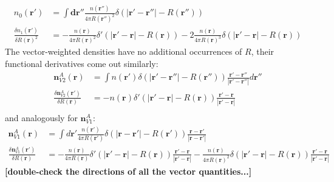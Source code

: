 \documentclass[letterpaper,twocolumn,amsmath,amssymb,jcp,10pt,aip]{revtex4-1}
\newcommand{\red}[1]{{\bf \color{red} #1}}
\newcommand{\rr}{\textbf{r}}
\newcommand{\fixme}[1]{\red{[#1]}}
\begin{document}
\begin{widetext}
\begin{align}
  n_0(\rr') &= \int \mathbf{dr''} \frac{n(\rr'')}{4\pi R(\rr'')^2}
  \delta(|\rr'-\rr''| - R(\rr'')) \\
  \frac{\delta n_1(\rr')}{\delta R(\rr)^2}
  &= -\frac{n(\rr)}{4\pi
    R(\rr)^2}\delta'(|\rr'-\rr| - R(\rr))
  -
  2\frac{n(\rr)}{4\pi
    R(\rr)^3}\delta(|\rr'-\rr| - R(\rr))
\end{align}
The vector-weighted densities have no additional occurrences of $R$,
their functional derivatives come out similarly:
\begin{align}
  \mathbf{n}_{V2}^{A}(\rr) &= \int n(\rr') \delta(|\rr' - \rr''| - R(\rr''))
    \frac{\rr'-\rr''}{|\rr'-\rr''|} d \rr''\\
  \frac{\delta \mathbf{n}_{V2}^{A}(\rr')}{\delta R(\rr)} &= - n(\rr) \delta'(|\rr' - \rr| - R(\rr))
    \frac{\rr'-\rr}{|\rr'-\rr|}\\
\end{align}
and analogously for $\mathbf{n}_{V1}^A$:
\begin{align}
  \mathbf{n}_{V1}^A(\rr) &= \int d\rr' \frac{n(\rr')}{4\pi R(\rr')}
  \delta(|\mathbf{r}-\rr'| - R(\rr')) \frac{\rr-\rr'}{|\rr-\rr'|}\\
  \frac{\delta \mathbf{n}_{V1}^A(\rr')}{\delta R(\rr)}
  &= -\frac{n(\rr)}{4\pi
    R(\rr)}\delta'(|\rr'-\rr| - R(\rr)) \frac{\rr'-\rr}{|\rr'-\rr|}
  -
  \frac{n(\rr)}{4\pi
    R(\rr)^2}\delta(|\rr'-\rr| - R(\rr)) \frac{\rr'-\rr}{|\rr'-\rr|}
\end{align}
\fixme{double-check the directions of all the vector quantities...}


\end{widetext}
\end{document}
